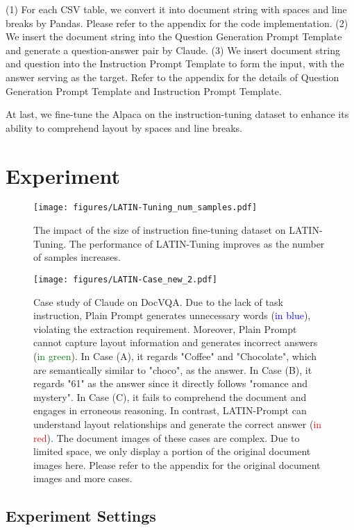 \documentclass[letterpaper]{article} \usepackage{aaai24_preprint}  \usepackage{times}  \usepackage{helvet}  \usepackage{courier}  \usepackage[hyphens]{url}  \usepackage{graphicx} \urlstyle{rm} \def\UrlFont{\rm}  \usepackage{natbib}  \usepackage{caption} \frenchspacing  \setlength{\pdfpagewidth}{8.5in} \setlength{\pdfpageheight}{11in} \usepackage{algorithm}
\begin{document}
(1) For each CSV table, we convert it into document string with spaces and line breaks by Pandas.
Please refer to the appendix for the code implementation.
(2) We insert the document string into the Question Generation Prompt Template and generate a question-answer pair by Claude.
(3) We insert document string and question into the Instruction Prompt Template to form the input, with the answer serving as the target.
Refer to the appendix for the details of Question Generation Prompt Template and Instruction Prompt Template.

At last, we fine-tune the Alpaca on the instruction-tuning dataset to enhance its ability to comprehend layout by spaces and line breaks.

\section{Experiment}
\label{sec:exp}
\begin{figure}[t]
\centering
\small
\texttt{[image: figures/LATIN-Tuning\_num\_samples.pdf]}
\caption{
The impact of the size of instruction fine-tuning dataset on LATIN-Tuning.
The performance of LATIN-Tuning improves as the number of samples increases.
}
\label{fig:exp_ablation_latin_tuning}
\end{figure}

\begin{figure*}[t]
\small
\centering
\texttt{[image: figures/LATIN-Case\_new\_2.pdf]}
\caption{
Case study of Claude on DocVQA.
Due to the lack of task instruction, Plain Prompt generates unnecessary words (\textcolor{blue}{in blue}), violating the extraction requirement.
Moreover, Plain Prompt cannot capture layout information and generates incorrect answers (\textcolor{green}{in green}).
In Case (A), it regards "Coffee" and "Chocolate", which are semantically similar to "choco", as the answer.
In Case (B), it regards "61" as the answer since it directly follows "romance and mystery".
In Case (C), it fails to comprehend the document and engages in erroneous reasoning.
In contrast, LATIN-Prompt can understand layout relationships and generate the correct answer (\textcolor{red}{in red}).
The document images of these cases are complex.
Due to limited space, we only display a portion of the original document images here.
Please refer to the appendix for the original document images and more cases.
}
\label{fig:case}
\end{figure*}

\subsection{Experiment Settings}
\label{sec:exp_settings}
\end{document}
